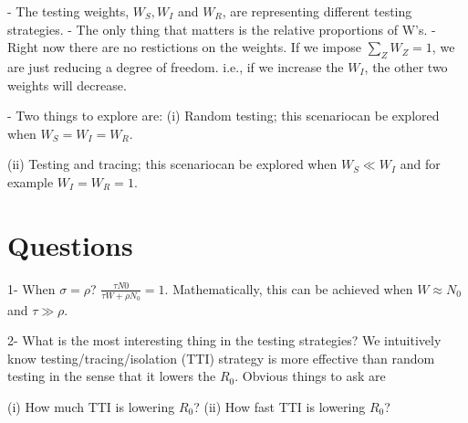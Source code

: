 - The testing weights, $W_S, W_I$ and $W_R$, are representing different testing strategies.
- The only thing that matters is the relative proportions of W's.
- Right now there are no restictions on the weights. If we impose $\sum_Z W_Z=1$, we are just reducing a degree of freedom. i.e., if we increase the $W_I$, the other two weights will decrease.

- Two things to explore are: 
(i) Random testing; this scenariocan be explored when $W_S=W_I=W_R$.

(ii) Testing and tracing; this scenariocan be explored when $W_S \ll W_I$ and for example $W_I=W_R=1$.

\section{Questions}

1- When $\sigma=\rho$?  
  $\frac{\tau N0}{\tau W+ \rho N_0} = 1$. Mathematically, this can be achieved when $W \approx N_0$ and   $\tau \gg \rho$.

2- What is the most interesting thing in the testing strategies?
We intuitively know testing/tracing/isolation (TTI) strategy is more effective than random testing in the sense that it lowers the $R_0$. Obvious things to ask are

(i)  How much TTI is lowering $R_0$? 
(ii) How fast TTI is lowering $R_0$?

\citep{endo2020implication}



